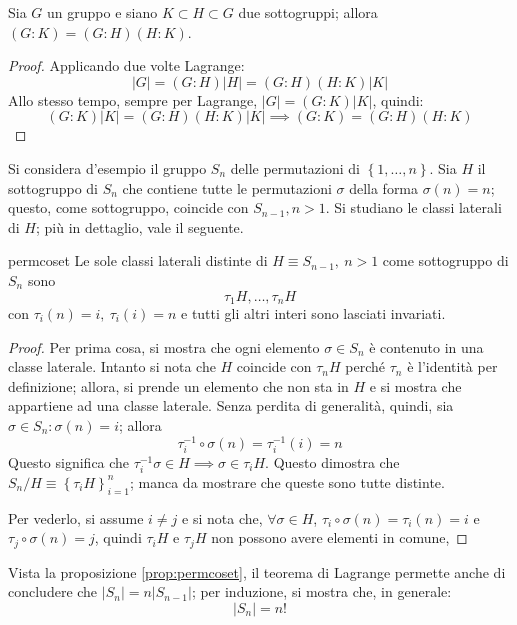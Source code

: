 \documentclass[11pt, a4paper]{scrartcl}
\theoremstyle{definition}
\numberwithin{esempio}{section}
\theoremstyle{definition}
\numberwithin{obs}{section}
\numberwithin{nota}{section}
\numberwithin{equation}{subsection}
\begin{document}
\begin{corollario}
	{}{}
	Sia $G$ un gruppo e siano $K \subset H \subset G$ due sottogruppi; allora $(G:K) = (G:H)(H:K)$.
	\begin{proof}
Applicando due volte Lagrange:
\[
|G| = (G:H) |H| = (G:H) (H:K) |K|
\] 
Allo stesso tempo, sempre per Lagrange, $|G| = (G:K) |K|$, quindi:
\[
(G:K) |K| = (G:H)(H:K)|K|\implies (G:K)= (G:H)(H:K)
\] 
	\end{proof}
\end{corollario}

Si considera d'esempio il gruppo $S_n$ delle permutazioni di $\left\{ 1, \ldots , n \right\} $. 
Sia $H$ il sottogruppo di $S_n$ che contiene tutte le permutazioni $\sigma $ della forma $\sigma (n) = n $; questo, come sottogruppo, coincide con $S_{n-1} , n > 1$.
Si studiano le classi laterali di $H$; pi\`u in dettaglio, vale il seguente.
\begin{prop}
	{}{permcoset}
	Le sole classi laterali distinte di $H \equiv S_{n-1} , \ n > 1$ come sottogruppo di $S_n$ sono
	\begin{equation}
		\tau _1 H , \ldots , \tau _n H
	\end{equation}
	con $\tau _i (n) = i, \ \tau_i (i) =n$ e tutti gli altri interi sono lasciati invariati.
	\begin{proof}
		Per prima cosa, si mostra che ogni elemento $\sigma \in S_n$ \`e contenuto in una classe laterale. 
		Intanto si nota che $H$ coincide con $\tau _n H$ perch\'e $\tau _n$ \`e l'identit\`a per definizione;
		allora, si prende un elemento che non sta in $H$ e si mostra che appartiene ad una classe laterale.
		Senza perdita di generalit\`a, quindi, sia $\sigma \in S_n : \sigma (n ) = i$; allora
		\[
		\tau _i ^{-1} \circ \sigma (n) = \tau _i ^{-1} (i)= n 
		\] 
		Questo significa che $\tau ^{-1} _i \sigma \in H \implies \sigma \in \tau _i H$. 
		Questo dimostra che $S_n / H \equiv \left\{ \tau _i H  \right\} _{i=1} ^n$; manca da mostrare che queste sono tutte distinte.

		Per vederlo, si assume $i\neq j$ e si nota che, $\forall \sigma \in H$, $\tau _i \circ\sigma(n) = \tau _i (n) = i$ e $\tau _j \circ \sigma (n) = j$, quindi $\tau _i H$ e $\tau _j H$ non possono avere elementi in comune,
	\end{proof}
\end{prop} 
Vista la proposizione \ref{prop:permcoset}, il teorema di Lagrange permette anche di concludere che $|S_n| = n |S_{n-1} |$; per induzione, si mostra che, in generale:
\begin{equation}
	|S_n| = n!
\end{equation}
\end{document}

